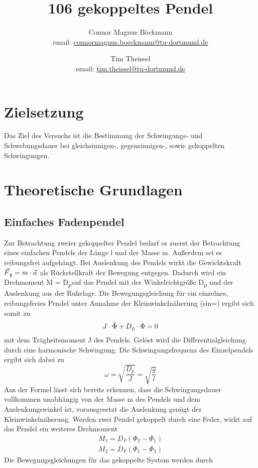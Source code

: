 \documentclass[titlepage=firstcover, captions=tableheading]{scrartcl}
\title{106 gekoppeltes Pendel}
\author{
Connor Magnus Böckmann \\ email: \href{mailto:connormagnus.boeckmann@tu-dortmund.de}{connormagnus.boeckmann@tu-dortmund.de}
\and Tim Theissel \\ email: \href{mailto:tim.theissel@tu-dortmund.de}{tim.theissel@tu-dortmund.de}  
}
\begin{document}
\maketitle
\newpage
\tableofcontents
\newpage
\section{Zielsetzung}
Das Ziel des Versuchs ist die Bestimmung der Schwingungs- und Schwebungsdauer bei gleichsinnigen-, gegensinnigen-, sowie gekoppelten Schwingungen.
\section{Theoretische Grundlagen}
\subsection{Einfaches Fadenpendel}
Zur Betrachtung zweier gekoppelter Pendel bedarf es zuerst der Betrachtung eines einfachen Pendels der Länge l und der Masse m. Außerdem sei es reibungsfrei aufgehängt. Bei Auslenkung des Pendels wirkt die Gewichtskraft $\vec{F}\textsubscript{g} = m\cdot\vec{a}$ als Rückstellkraft der Bewegung entgegen. Dadurch wird ein Drehmoment M = D\textsubscript{p}\cdot\Phi  auf das Pendel mit der Winkelrichtgröße D\textsubscript{p} und der Auslenkung \Phi   aus der Ruhelage. Die Bewegungsgleichung für ein einzelnes, reibungsfreies Pendel unter Annahme der Kleinwinkelnäherung (sin\theta=\theta) ergibt sich somit zu 
\begin{equation}
    J\cdot\ddot{\Phi}+D\textsubscript{p}\cdot\Phi=0 \label{(1)}
\end{equation}
mit dem Trägheitsmoment J des Pendels. Gelöst wird die Differentialgleichung durch eine harmonische Schwingung. Die Schwingungsfrequenz des Einzelpendels ergibt sich dabei zu  
\begin{displaymath}
    \omega=\sqrt{\frac{D_p}{J}}=\sqrt{\frac{g}{l}}
\end{displaymath}
Aus der Formel lässt sich bereits erkennen, dass die Schwingungsdauer vollkommen unabhängig von der Masse m des Pendels und dem Auslenkungswinkel \Phi ist, vorausgesetzt die Auslenkung genügt der Kleinwinkelnäherung.
Werden zwei Pendel gekoppelt durch eine Feder, wirkt auf das Pendel ein weiteres Drehmoment
\begin{align}
    M_1=D_F(\Phi_2-\Phi_1) \label{(2)}\\
    M_2=D_F(\Phi_1-\Phi_2) \label{(3)}
\end{align}
Die Bewegungsgleichungen für das gekoppelte System werden durch 
\end{document}
